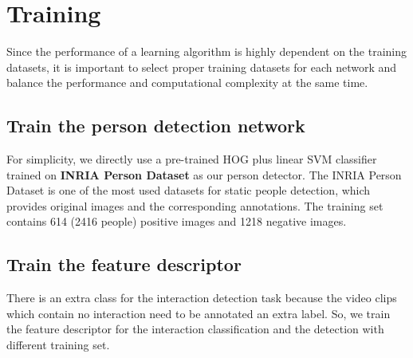 \section{Training}
\label{3_4}
Since the performance of a learning algorithm is highly dependent on the training datasets, it is important to select proper training datasets for each network and balance the performance and computational complexity at the same time.
  
\subsection{Train the person detection network}
For simplicity, we directly use a pre-trained HOG plus linear SVM classifier trained on \textbf{INRIA Person Dataset} \cite{inria_person} as our person detector. The INRIA Person Dataset is one of the most used datasets for static people detection, which provides original images and the corresponding annotations. The training set contains 614 (2416 people) positive images and 1218 negative images.

\subsection{Train the feature descriptor}
There is an extra class for the interaction detection task because the video clips which contain no interaction need to be annotated an extra label. So, we train the feature descriptor for the interaction classification and the detection with different training set.

